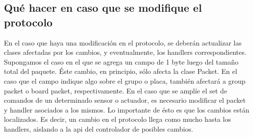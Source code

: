 \subsection{Qu\'e hacer en caso que se modifique el protocolo}
En el caso que haya una modificaci\'on en el protocolo, se deber\'an
actualizar las clases afectadas por los cambios, y eventualmente,
los handlers correspondientes.
\\\indent
Supongamos el caso en el que se agrega un campo de 1 byte luego del tama\~no
total del paquete. \'Este cambio, en principio, s\'olo afecta la clase
Packet. En el caso que el campo indique algo sobre el grupo o placa,
tambi\'en afectar\'a a group packet o board packet, respectivamente.
En el caso que se ampl\'ie el set de comandos de un determinado sensor o
actuador, es necesario modificar el packet y handler asociados a los
mismos. Lo importante de \'esto es que los cambios est\'an localizados.
Es decir, un cambio en el protocolo llega como mucho hasta los handlers,
aislando a la api del controlador de posibles cambios.





